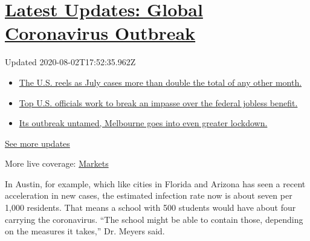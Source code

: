 \hypertarget{latest-updates-global-coronavirus-outbreak}{%
\section{\texorpdfstring{\href{https://www.nytimes3xbfgragh.onion/2020/08/01/world/coronavirus-covid-19.html?action=click\&pgtype=Article\&state=default\&region=MAIN_CONTENT_1\&context=storylines_live_updates}{Latest
Updates: Global Coronavirus
Outbreak}}{Latest Updates: Global Coronavirus Outbreak}}\label{latest-updates-global-coronavirus-outbreak}}

Updated 2020-08-02T17:52:35.962Z

\begin{itemize}
\tightlist
\item
  \href{https://www.nytimes3xbfgragh.onion/2020/08/01/world/coronavirus-covid-19.html?action=click\&pgtype=Article\&state=default\&region=MAIN_CONTENT_1\&context=storylines_live_updates\#link-34047410}{The
  U.S. reels as July cases more than double the total of any other
  month.}
\item
  \href{https://www.nytimes3xbfgragh.onion/2020/08/01/world/coronavirus-covid-19.html?action=click\&pgtype=Article\&state=default\&region=MAIN_CONTENT_1\&context=storylines_live_updates\#link-780ec966}{Top
  U.S. officials work to break an impasse over the federal jobless
  benefit.}
\item
  \href{https://www.nytimes3xbfgragh.onion/2020/08/01/world/coronavirus-covid-19.html?action=click\&pgtype=Article\&state=default\&region=MAIN_CONTENT_1\&context=storylines_live_updates\#link-2bc8948}{Its
  outbreak untamed, Melbourne goes into even greater lockdown.}
\end{itemize}

\href{https://www.nytimes3xbfgragh.onion/2020/08/01/world/coronavirus-covid-19.html?action=click\&pgtype=Article\&state=default\&region=MAIN_CONTENT_1\&context=storylines_live_updates}{See
more updates}

More live coverage:
\href{https://www.nytimes3xbfgragh.onion/live/2020/07/31/business/stock-market-today-coronavirus?action=click\&pgtype=Article\&state=default\&region=MAIN_CONTENT_1\&context=storylines_live_updates}{Markets}

In Austin, for example, which like cities in Florida and Arizona has
seen a recent acceleration in new cases, the estimated infection rate
now is about seven per 1,000 residents. That means a school with 500
students would have about four carrying the coronavirus. ``The school
might be able to contain those, depending on the measures it takes,''
Dr. Meyers said.

